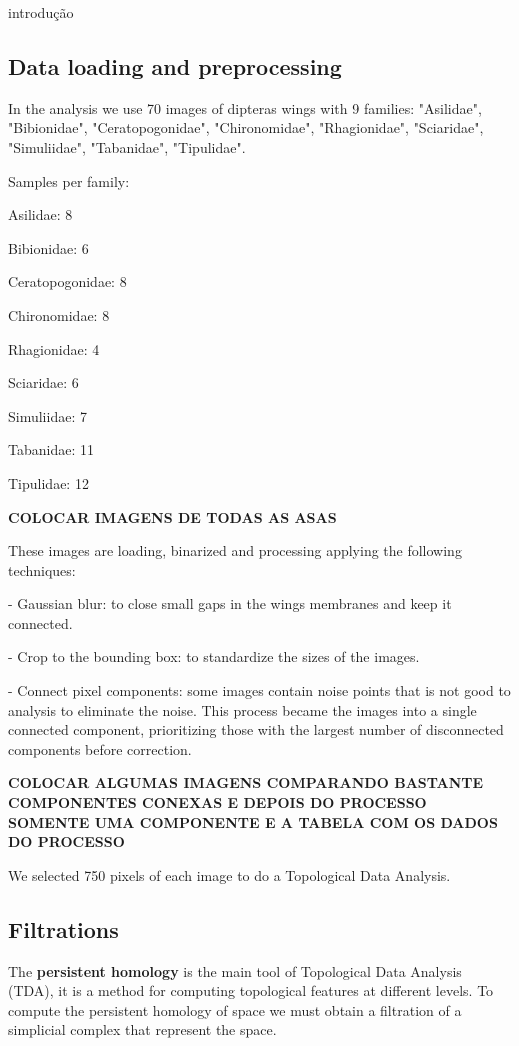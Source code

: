 \documentclass{birkjour}
\theoremstyle{definition}
\theoremstyle{remark}
\numberwithin{equation}{section}
\begin{document}
 introdução

\subsection{Data loading and preprocessing}\quad

In the analysis we use 70 images of dipteras wings with 9 families: "Asilidae", "Bibionidae", "Ceratopogonidae", "Chironomidae", "Rhagionidae", "Sciaridae", "Simuliidae", "Tabanidae", "Tipulidae".

{\noindent Samples per family:

  Asilidae: 8
  
  Bibionidae: 6
  
  Ceratopogonidae: 8
  
  Chironomidae: 8
  
  Rhagionidae: 4
  
  Sciaridae: 6
  
  Simuliidae: 7
  
  Tabanidae: 11
  
  Tipulidae: 12}

{\bf COLOCAR IMAGENS DE TODAS AS ASAS}


These images are loading, binarized and processing applying the following techniques:

- Gaussian blur: to close small gaps in the wings membranes and keep it connected.

- Crop to the bounding box: to standardize the sizes of the images. 

- Connect pixel components: some images contain noise points that is not good to analysis to eliminate the noise. This process became the images into a single connected component, prioritizing those with the largest number of disconnected components before correction.

{\bf COLOCAR ALGUMAS IMAGENS COMPARANDO BASTANTE COMPONENTES CONEXAS E DEPOIS DO PROCESSO SOMENTE UMA COMPONENTE E A TABELA COM OS DADOS DO PROCESSO}

We selected 750 pixels of each image to do a Topological Data Analysis.



\subsection{Filtrations}
\quad


The \textbf{persistent homology} is the main tool of Topological Data Analysis (TDA), it is a  method for computing topological features at different levels.
To compute the persistent homology of space we must obtain a filtration of  a simplicial complex that represent the space. 
\end{document}
